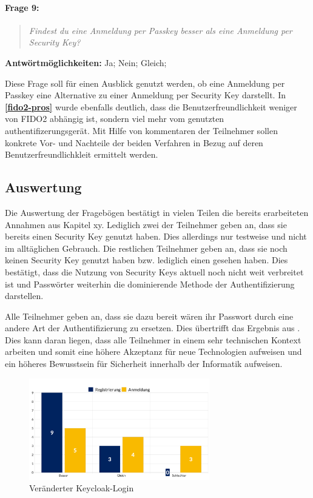 \paragraph{Frage 9:}

\begin{quote}
    \textit{Findest du eine Anmeldung per Passkey besser als eine Anmeldung per Security Key?}
\end{quote}

\textbf{Antwörtmöglichkeiten:} Ja; Nein; Gleich;

Diese Frage soll für einen Ausblick genutzt werden, ob eine Anmeldung per Passkey eine Alternative zu einer Anmeldung per Security Key darstellt. In \textbf{\ref{fido2-pros}} wurde ebenfalls deutlich, dass die Benutzerfreundlichkeit weniger von \ac{FIDO}2 abhängig ist, sondern viel mehr vom genutzten authentifizerungsgerät.  Mit Hilfe von kommentaren der Teilnehmer sollen konkrete Vor- und Nachteile der beiden Verfahren in Bezug auf deren Benutzerfreundlichkleit ermittelt werden.


\subsection{Auswertung}
Die Auswertung der Fragebögen bestätigt in vielen Teilen die bereits erarbeiteten Annahmen aus Kapitel xy. Lediglich zwei der Teilnehmer geben an, dass sie bereits einen Security Key genutzt haben. Dies allerdings nur testweise und nicht im alltäglichen Gebrauch. Die restlichen Teilnehmer geben an, dass sie noch keinen Security Key genutzt haben bzw. lediglich einen gesehen haben. Dies bestätigt, dass die Nutzung von Security Keys aktuell noch nicht weit verbreitet ist und Passwörter weiterhin die dominierende Methode der Authentifizierung darstellen.

Alle Teilnehmer geben an, dass sie dazu bereit wären ihr Passwort durch eine andere Art der Authentifizierung zu ersetzen. Dies übertrifft das Ergebnis aus \cite{techstat}. Dies kann daran liegen, dass alle Teilnehmer in einem sehr technischen Kontext arbeiten und somit eine höhere Akzeptanz für neue Technologien aufweisen und ein höheres Bewusstsein für Sicherheit innerhalb der Informatik aufweisen. 

\begin{figure}[H]
	\centering 
	\includegraphics[width=0.7\textwidth]{img/abbildungen/chart_anmeldung_register.png}
	\captionsetup{format=hang}
	\caption{Veränderter Keycloak-Login}
\end{figure}

